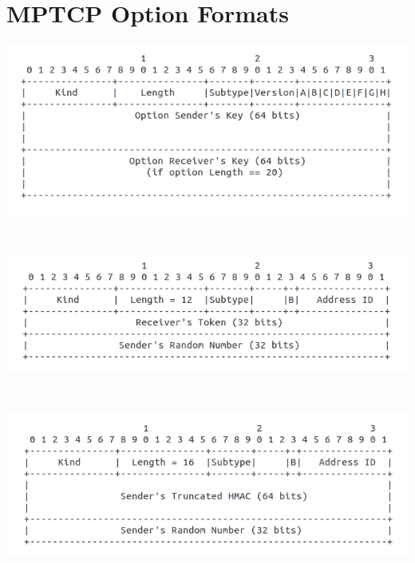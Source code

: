 
\chapter{MPTCP Option Formats} \label{append:mp opt format}


\begin{minipage}[c]{\textwidth}
\includegraphics[width=\textwidth]{Figures/mpcapformat.png}
\end{minipage} \\

\begin{minipage}[c]{\textwidth}

\includegraphics[width=\textwidth]{Figures/mpjoinformat1.png}
\end{minipage} \\

\begin{minipage}[c]{\textwidth}

\includegraphics[width=\textwidth]{Figures/mpjoinformat2.png}
\end{minipage} \\

